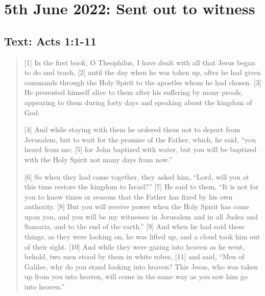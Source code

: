 \section{5th June 2022: Sent out to witness}
\subsection*{Text: Acts 1:1-11}
  \begin{quote}
    [1] In the first book, O Theophilus, I have dealt with all that Jesus
    began to do and teach, [2] until the day when he was taken up, after he
    had given commands through the Holy Spirit to the apostles whom he had
    chosen.  [3] He presented himself alive to them after his suffering by
    many proofs, appearing to them during forty days and speaking about the
    kingdom of God.

    [4] And while staying with them he ordered them not to depart from
    Jerusalem, but to wait for the promise of the Father, which, he said,
    “you heard from me; [5] for John baptized with water, but you will be
    baptized with the Holy Spirit not many days from now.”

    [6] So when they had come together, they asked him, “Lord, will you at
    this time restore the kingdom to Israel?” [7] He said to them, “It is not
    for you to know times or seasons that the Father has fixed by his own
    authority.  [8] But you will receive power when the Holy Spirit has come
    upon you, and you will be my witnesses in Jerusalem and in all Judea and
    Samaria, and to the end of the earth.” [9] And when he had said these
    things, as they were looking on, he was lifted up, and a cloud took him
    out of their sight.  [10] And while they were gazing into heaven as he
    went, behold, two men stood by them in white robes, [11] and said, “Men
    of Galilee, why do you stand looking into heaven?  This Jesus, who was
    taken up from you into heaven, will come in the same way as you saw him
    go into heaven.”
  \end{quote}
